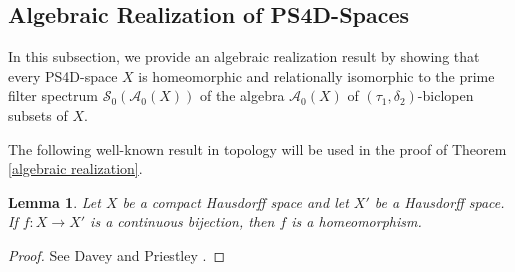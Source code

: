 \documentclass{amsart}
\theoremstyle{plain}
\newtheorem{lemma}[theorem]{Lemma}
\theoremstyle{definition}
\begin{document}
\subsection{Algebraic Realization of PS4D-Spaces}
In this subsection, we provide an algebraic realization result by showing that every PS4D-space $X$ is homeomorphic and relationally isomorphic to the prime filter spectrum $\mathcal{S}_0(\mathcal{A}_0(X))$ of the algebra $\mathcal{A}_0(X)$ of $(\tau_1,\delta_2)$-biclopen subsets of $X$.   

The following well-known result in topology will be used in the proof of Theorem \ref{algebraic realization}. 

\begin{lemma}\label{topology lemma}
Let $X$ be a compact Hausdorff space and let $X'$ be a Hausdorff space. If $f\colon X\to X'$ is a continuous bijection, then $f$ is a homeomorphism. 
\end{lemma}
\begin{proof}
See Davey and Priestley \cite[Lemma A.7, p. 277]{davey}. 
\end{proof}
\end{document}

